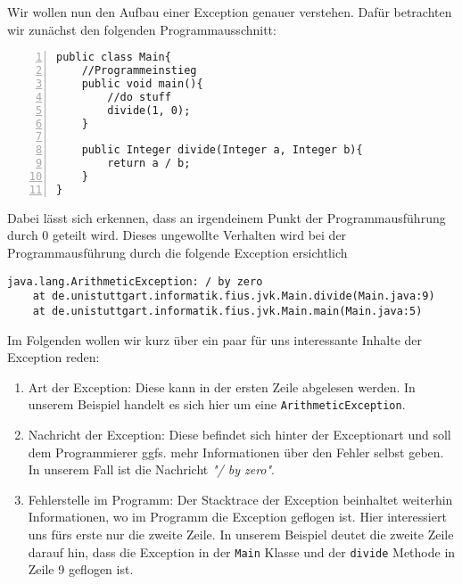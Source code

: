 \begin{Infobox}
    Wir wollen nun den Aufbau einer Exception genauer verstehen. Dafür betrachten wir zunächst den folgenden Programmausschnitt:
    \begin{lstlisting}[numbers=left,xleftmargin=2em,frame=single,framexleftmargin=1.5em]
public class Main{
    //Programmeinstieg
    public void main(){
        //do stuff
        divide(1, 0);
    }
    
    public Integer divide(Integer a, Integer b){
        return a / b;
    }
}
    \end{lstlisting}
    Dabei lässt sich erkennen, dass an irgendeinem Punkt der Programmausführung durch 0 geteilt wird.
    Dieses ungewollte Verhalten wird bei der Programmausführung durch die folgende Exception ersichtlich
    \begin{lstlisting}[keywords={}, breaklines=true, numbers=none]
java.lang.ArithmeticException: / by zero
    at de.unistuttgart.informatik.fius.jvk.Main.divide(Main.java:9)
    at de.unistuttgart.informatik.fius.jvk.Main.main(Main.java:5)
    \end{lstlisting}    
    Im Folgenden wollen wir kurz über ein paar für uns interessante Inhalte der Exception reden:
    \begin{enumerate}[label=\roman*)]
        \item Art der Exception: Diese kann in der ersten Zeile abgelesen werden. In unserem Beispiel handelt es sich hier um eine \lstinline{ArithmeticException}.
        \item Nachricht der Exception: Diese befindet sich hinter der Exceptionart und soll dem Programmierer ggfs. mehr Informationen über den Fehler selbst geben.
        In unserem Fall ist die Nachricht \textit{"/ by zero"}.
        \item Fehlerstelle im Programm: Der Stacktrace der Exception beinhaltet weiterhin Informationen, wo im Programm die Exception geflogen ist. Hier interessiert uns 
        fürs erste nur die zweite Zeile. In unserem Beispiel deutet die zweite Zeile darauf hin, dass die Exception in der \lstinline{Main} Klasse und der \lstinline{divide}
        Methode in Zeile 9 geflogen ist.
    \end{enumerate}
\end{Infobox}
